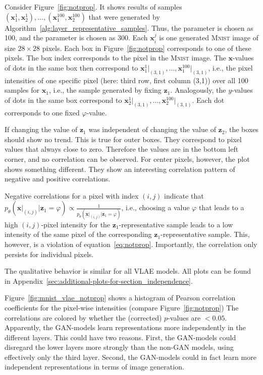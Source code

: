 Consider Figure~\ref{fig:notprop}.
It shows results of samples $(\bm{x}_1^1,\bm{x}_2^1),\dots,(\bm{x}_1^{100},\bm{x}_2^{100})$ that were generated by Algorithm~\ref{alg:layer_representative_samples}.
Thus, the parameter  is chosen as 100, and the parameter  is chosen as 300.
Each $\bm{x}_i^j$ is one generated \textsc{Mnist} image of size $28\times 28$ pixels.
Each box in Figure~\ref{fig:notprop} corresponds to one of these pixels.
The box index corresponds to the pixel in the \textsc{Mnist} image.
The $\bm{x}$-values of dots in the same box then correspond to $\bm{x}_1^1\big|_{(3,1)}, \dots, \bm{x}_1^{100}\big|_{(3,1)}$, i.e., the pixel intensities of one specific pixel (here: third row, first column (3,1)) over all 100 samples for $\bm{x}_1$, i.e., the sample generated by fixing $\bm{z}_1$.
Analogously, the $y$-values of dots in the same box correspond to $\bm{x}_2^1\big|_{(3,1)}, \dots, \bm{x}_2^{100}\big|_{(3,1)}$.
Each dot corresponds to one fixed $\varphi$-value.

If changing the value of $\bm{z}_1$ was independent of changing the value of $\bm{z}_2$, the boxes should show no trend.
This is true for outer boxes.
They correspond to pixel values that always close to zero.
Therefore the values are in the bottom left corner, and no correlation can be observed.
For center pixels, however, the plot shows something different.
They show an interesting correlation pattern of negative and positive correlations.

Negative correlations for a pixel with index $(i,j)$ indicate that $p_\theta(\bm{x}\big|_{(i,j)} | \bm{z}_1 = \varphi) \propto \frac{1}{p_\theta(\bm{x}\big|_{(i,j)} | \bm{z}_1 = \varphi)}$, i.e., choosing a value $\varphi$ that leads to a high $(i,j)$-pixel intensity for the $\bm{z}_1$-representative sample leads to a low intensity of the same pixel of the corresponding $\bm{z}_1$-representative sample.
This, however, is a violation of equation~\ref{eq:notprop}.
Importantly, the correlation only persists for individual pixels.

The qualitative behavior is similar for all \ac{VLAE} models.
All plots can be found in Appendix~\ref{sec:additional-plots-for-section_independence}.

Figure~\ref{fig:mnist_vlae_notprop} shows a histogram of Pearson correlation coefficients for the pixel-wise intensities (compare Figure~\ref{fig:notprop})
The correlations are colored by whether the (corrected) $p$-values are $< 0.05$.
Apparently, the \ac{GAN}-models learn representations more independently in the different layers.
This could have two reasons.
First, the \ac{GAN}-models could disregard the lower layers more strongly than the non-\ac{GAN} models, using effectively only the third layer.
Second, the \ac{GAN}-models could in fact learn more independent representations in terms of image generation.

